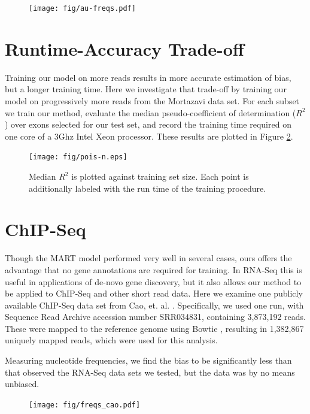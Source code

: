 \documentclass[letterpaper]{article}
\begin{document}
\begin{figure}[H]
\centerline{\texttt{[image: fig/au-freqs.pdf]}}
\caption{}
\label{fig:aufreqs}
\end{figure}


\section{Runtime-Accuracy Trade-off}

Training our model on more reads results in more accurate estimation of bias,
but a longer training time. Here we investigate that trade-off by training our
model on progressively more reads from the Mortazavi data set. For each subset
we train our method, evaluate the median pseudo-coefficient of determination
($R^2$) over exons selected for our test set, and record the training time
required on one core of a 3Ghz Intel Xeon processor. These results are plotted
in Figure \ref{fig:poisn}.

\begin{figure}[H]
\texttt{[image: fig/pois-n.eps]}
\caption{Median $R^2$ is plotted against training set size. Each point is
additionally labeled with the run time of the training procedure.}
\label{fig:poisn}
\end{figure}



\section{ChIP-Seq}

Though the MART model \cite{Li2010} performed very well in several cases, ours
offers the advantage that no gene annotations are required for training.  In
RNA-Seq this is useful in applications of de-novo gene discovery, but it also
allows our method to be applied to ChIP-Seq and other short read data. Here we
examine one publicly available ChIP-Seq data set from Cao, et. al.
\cite{Cao2010}. Specifically, we used one run, with Sequence Read Archive
accession number SRR034831, containing 3,873,192 reads. These were mapped to the
reference genome using Bowtie \cite{Langmead2009}, resulting in 1,382,867
uniquely mapped reads, which were used for this analysis.

Measuring nucleotide frequencies, we find the bias to be significantly less
than that observed the RNA-Seq data sets we tested, but the data was by no means
unbiased.

\begin{figure}[H]
\begin{center}
\texttt{[image: fig/freqs\_cao.pdf]}
\end{center}
\label{fig:trimmedfreqs}
\end{figure}
\end{document}
